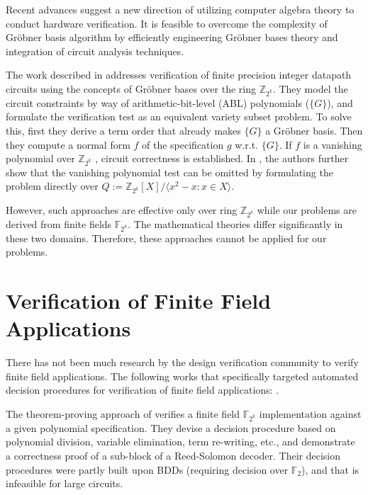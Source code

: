 Recent advances \cite{wienand:cav08}  \cite{wedler:date11} 
suggest a new direction of utilizing computer algebra theory to conduct hardware verification. 
It is feasible to overcome the complexity of Gr\"obner basis algorithm
by efficiently engineering Gr\"obner bases theory and integration of circuit analysis techniques.

The work described in \cite{wienand:cav08} addresses verification of finite
precision integer datapath circuits using the concepts of  Gr\"obner
bases over the ring ${\mathbb{Z}}_{2^k}$. They model the circuit
constraints by way of arithmetic-bit-level (ABL) polynomials
($\{G\}$), and formulate the verification test as an equivalent
variety subset problem. To solve this, first they derive a term order
that already makes $\{G\}$ a Gr\"obner basis. Then they compute a
normal form $f$ of the specification $g$ w.r.t. $\{G\}$. If $f$ is a
vanishing polynomial over ${\mathbb{Z}}_{2^k}$ \cite{shekhar:tcad07},
circuit correctness is established. In \cite{wedler:date11}, the
authors further show that  the vanishing polynomial test can be
omitted by formulating the problem directly over $Q :=
{\mathbb{Z}}_{2^k} [X]/\langle x^2-x : x \in X \rangle$. 

However, such approaches are effective only over ring $\mathbb{Z}_{2^k}$
while our problems are derived from finite fields $\mathbb{F}_{2^k}$.
The mathematical theories differ significantly in these two domains.
Therefore, these approaches cannot be applied for our problems.
\section{Verification of Finite Field Applications}
There has not been much research by the design verification community
to verify finite field applications. 
The following works that specifically targeted automated decision
procedures for verification of finite field applications:
\cite{Morioka} \cite{Mukho} \cite{pradhan_modd}. 


The theorem-proving approach of \cite{Morioka} verifies a finite
field $\mathbb{F}_{2^k}$ implementation against a given polynomial
specification. They devise a decision procedure based on polynomial
division, variable elimination, term re-writing, etc., and demonstrate
a correctness proof of a sub-block of a Reed-Solomon decoder. Their
decision procedures were partly built upon BDDs (requiring decision
over ${\mathbb{F}}_2$), and that is infeasible for large circuits. 

